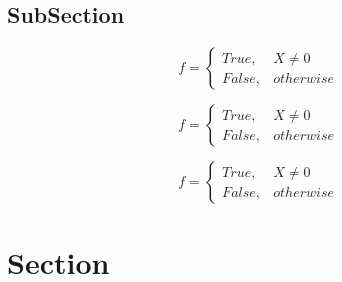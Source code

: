 \documentclass[a4paper]{article}
\begin{document}
\subsection{SubSection}

\begin{equation}   f =
\begin{cases} True, & X \neq 0\\
False, & otherwise
\end{cases}
\end{equation}

\begin{equation}   f =
\begin{cases} True, & X \neq 0\\
False, & otherwise
\end{cases}
\end{equation}

\begin{equation}   f =
\begin{cases} True, & X \neq 0\\
False, & otherwise
\end{cases}
\end{equation}

\section{Section}
\end{document}
